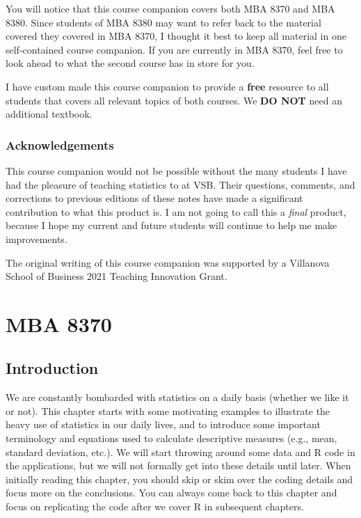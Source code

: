 \documentclass[
]{book}
\begin{document}
You will notice that this course companion covers both MBA 8370 and MBA 8380. Since students of MBA 8380 may want to refer back to the material covered they covered in MBA 8370, I thought it best to keep all material in one self-contained course companion. If you are currently in MBA 8370, feel free to look ahead to what the second course has in store for you.

I have custom made this course companion to provide a \textbf{free} resource to all students that covers all relevant topics of both courses. We \textbf{DO NOT} need an additional textbook.

\section*{Acknowledgements}\label{acknowledgements}

This course companion would not be possible without the many students I have had the pleasure of teaching statistics to at VSB. Their questions, comments, and corrections to previous editions of these notes have made a significant contribution to what this product is. I am not going to call this a \emph{final} product, because I hope my current and future students will continue to help me make improvements.

The original writing of this course companion was supported by a Villanova School of Business 2021 Teaching Innovation Grant.

\part*{MBA 8370}\label{part-mba-8370}

\chapter{Introduction}\label{intro}

We are constantly bombarded with statistics on a daily basis (whether we like it or not). This chapter starts with some motivating examples to illustrate the heavy use of statistics in our daily lives, and to introduce some important terminology and equations used to calculate descriptive measures (e.g., mean, standard deviation, etc.). We will start throwing around some data and R code in the applications, but we will not formally get into these details until later. When initially reading this chapter, you should skip or skim over the coding details and focus more on the conclusions. You can always come back to this chapter and focus on replicating the code after we cover R in subsequent chapters.
\end{document}
